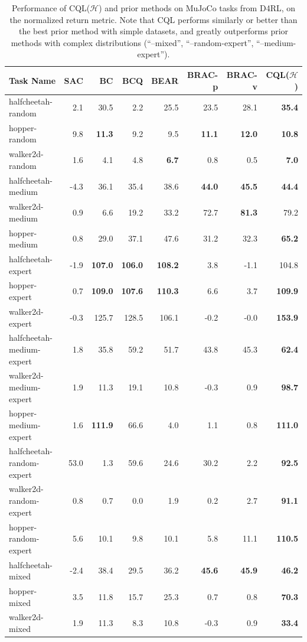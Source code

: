 \begin{table}[h]
\centering
\fontsize{8}{8}\selectfont

\begin{tabular}{l|r|r|r|r|r|r||r}
\hline
\textbf{Task Name} & \textbf{SAC} & \textbf{BC} & \textbf{BCQ} & \textbf{BEAR} & \textbf{BRAC-p} & \textbf{BRAC-v} & \textbf{CQL($\mathcal{H}$)}\\ \hline
halfcheetah-random &  2.1 & 30.5 & 2.2 & 25.5 & 23.5 & 28.1 & \textbf{35.4} \\
hopper-random & 9.8 & \textbf{11.3} & 9.2 & 9.5 & \textbf{11.1} & \textbf{12.0} & \textbf{10.8}\\
walker2d-random & 1.6 & 4.1 & 4.8 &  \textbf{6.7} & 0.8 & 0.5 & \textbf{7.0}\\ \hline
halfcheetah-medium & -4.3 & 36.1 & 35.4 & 38.6 & \textbf{44.0} & \textbf{45.5} & \textbf{44.4}\\
walker2d-medium & 0.9 & 6.6 & 19.2 & 33.2 & 72.7 & \textbf{81.3} & {79.2}\\
hopper-medium & 0.8 & 29.0 & 37.1 & 47.6 & 31.2 & 32.3 & \textbf{65.2}\\ \hline
halfcheetah-expert & -1.9 & \textbf{107.0} & \textbf{106.0} & \textbf{108.2} & 3.8 & -1.1 & {104.8}\\
hopper-expert & 0.7 & \textbf{109.0} & \textbf{107.6} & \textbf{110.3} & 6.6 & 3.7 & \textbf{109.9} \\
walker2d-expert & -0.3 & 125.7 & 128.5 & 106.1 & -0.2 & -0.0 & \textbf{153.9} \\ \hline
halfcheetah-medium-expert & 1.8 & 35.8 & 59.2 & 51.7 & 43.8 & 45.3 & \textbf{62.4}\\
walker2d-medium-expert & 1.9 & 11.3 & 19.1 & 10.8 & -0.3 & 0.9 & \textbf{98.7}\\
hopper-medium-expert & 1.6 & \textbf{111.9} & 66.6 & 4.0 & 1.1 & 0.8 & \textbf{111.0}\\ \hline
halfcheetah-random-expert & 53.0 & 1.3 & 59.6 & 24.6 & 30.2 & 2.2 & \textbf{92.5}\\
walker2d-random-expert & 0.8 & 0.7 & 0.0 & 1.9 & 0.2 & 2.7 & \textbf{91.1}\\
hopper-random-expert & 5.6 & 10.1 & 9.8 & 10.1 & 5.8 & 11.1 & \textbf{110.5} \\ \hline
halfcheetah-mixed & -2.4 & 38.4 & 29.5 & 36.2 & \textbf{45.6} & \textbf{45.9} & \textbf{46.2}\\
hopper-mixed & 3.5 & 11.8 & 15.7 & 25.3 & 0.7 & 0.8 & \textbf{70.3}\\
walker2d-mixed & 1.9 & 11.3 & 8.3 & 10.8 & -0.3 & 0.9 & \textbf{33.4}\\
\hline
\end{tabular}
\caption{\label{table:mujoco}{\small Performance of CQL($\mathcal{H}$) and prior methods on MuJoCo tasks from D4RL, on the normalized return metric. Note that CQL performs similarly or better than the best prior method with simple datasets, and greatly outperforms prior methods with complex distributions (``--mixed'', ``--random-expert'', ``--medium-expert'').}}
\normalsize
\vspace{-10pt}
\end{table}


